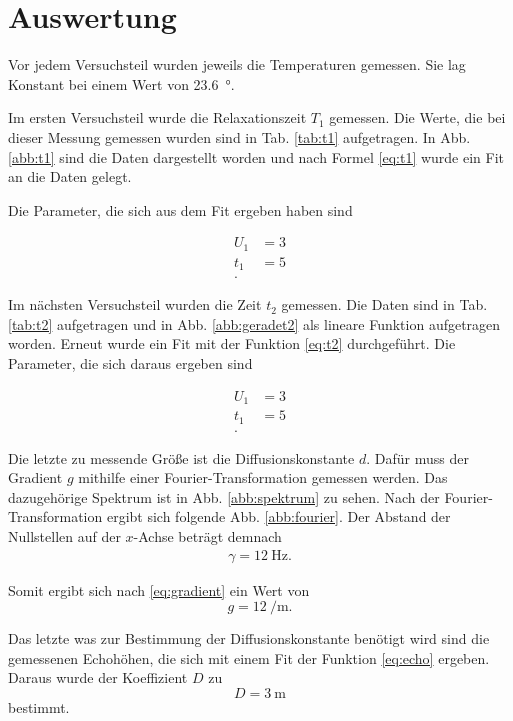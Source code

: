 \section{Auswertung}

Vor jedem Versuchsteil wurden jeweils die Temperaturen gemessen. 
Sie lag Konstant bei einem Wert von \SI{23.6}{\degree}.

Im ersten Versuchsteil wurde die Relaxationszeit $T_1$ gemessen. 
Die Werte, die bei dieser Messung gemessen wurden sind in Tab. \ref{tab:t1} aufgetragen. 
In Abb. \ref{abb:t1} sind die Daten dargestellt worden und nach Formel \eqref{eq:t1} wurde ein Fit an die Daten gelegt.

Die Parameter, die sich aus dem Fit ergeben haben sind 

\begin{align*}
U_1 &= 3 \\
t_1 &= 5 \\.
\end{align*}

Im nächsten Versuchsteil wurden die Zeit $t_2$ gemessen. 
Die Daten sind in Tab. \ref{tab:t2} aufgetragen und in Abb. \ref{abb:geradet2} als lineare Funktion aufgetragen worden. 
Erneut wurde ein Fit mit der Funktion \eqref{eq:t2} durchgeführt. 
Die Parameter, die sich daraus ergeben sind 

\begin{align*}
    U_1 &= 3 \\
    t_1 &= 5 \\.
\end{align*}

Die letzte zu messende Größe ist die Diffusionskonstante $d$. 
Dafür muss der Gradient $g$ mithilfe einer Fourier-Transformation gemessen werden. 
Das dazugehörige Spektrum ist in Abb. \ref{abb:spektrum} zu sehen. 
Nach der Fourier-Transformation ergibt sich folgende Abb. \ref{abb:fourier}. Der Abstand der Nullstellen auf der $x$-Achse beträgt demnach 
\begin{align*}
\gamma = \SI{12}{\hertz}.
\end{align*} 

Somit ergibt sich nach \eqref{eq:gradient} ein Wert von 
\begin{equation*}
g = \SI{12}{\per\metre}.
\end{equation*}

Das letzte was zur Bestimmung der Diffusionskonstante benötigt wird sind die gemessenen Echohöhen, die sich mit einem Fit der Funktion \eqref{eq:echo} ergeben. Daraus wurde der Koeffizient $D$ zu 
\begin{equation*}
D = \SI{3}{\metre}
\end{equation*}
bestimmt.

